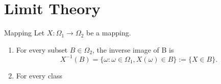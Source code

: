 \chapter{Limit Theory}

\begin{definition}{Mapping}{}
    Let $X:\Omega_1\rightarrow\Omega_2$ be a mapping.
    \begin{enumerate}
        \item 
        For every subset $B\in\Omega_2$, the inverse image of B is
        \begin{equation*}
            X^{-1}(B)=\{\omega:\omega\in\Omega_1,X(\omega)\in B\}:=\{X\in B\}.
        \end{equation*}
        \item 
        For every class 
    \end{enumerate}
\end{definition}
